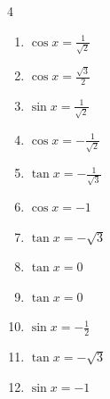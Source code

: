 \begin{multicols}{4}
\begin{enumerate}
  \item $\displaystyle \cos{x}  = \frac{1}{\sqrt{2}}$


  \item $\displaystyle \cos{x}  = \frac{\sqrt{3}}{2}$


  \item $\displaystyle \sin{x}  = \frac{1}{\sqrt{2}}$


  \item $\displaystyle \cos{x}  = -\frac{1}{\sqrt{2}}$


  \item $\displaystyle \tan{x}  = -\frac{1}{\sqrt{3}}$


  \item $\displaystyle \cos{x}  = -1$


  \item $\displaystyle \tan{x}  = -\sqrt{3}$


  \item $\displaystyle \tan{x}  = 0$


  \item $\displaystyle \tan{x}  = 0$


  \item $\displaystyle \sin{x}  = -\frac{1}{2}$


  \item $\displaystyle \tan{x}  = -\sqrt{3}$


  \item $\displaystyle \sin{x}  = -1$


\end{enumerate}
\end{multicols}
